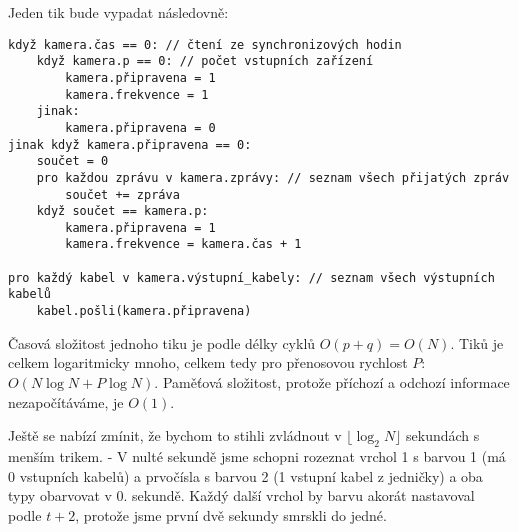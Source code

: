 \documentclass{article}
\begin{document}
Jeden tik bude vypadat následovně:
\begin{verbatim}
když kamera.čas == 0: // čtení ze synchronizových hodin
    když kamera.p == 0: // počet vstupních zařízení
        kamera.připravena = 1
        kamera.frekvence = 1
    jinak:
        kamera.připravena = 0
jinak když kamera.připravena == 0:
    součet = 0
    pro každou zprávu v kamera.zprávy: // seznam všech přijatých zpráv
        součet += zpráva
    když součet == kamera.p:
        kamera.připravena = 1
        kamera.frekvence = kamera.čas + 1

pro každý kabel v kamera.výstupní_kabely: // seznam všech výstupních kabelů
    kabel.pošli(kamera.připravena)
\end{verbatim}
Časová složitost jednoho tiku je podle délky cyklů \(O(p + q) = O(N)\). Tiků je celkem logaritmicky mnoho, celkem tedy pro přenosovou rychlost
\(P\): \(O(N \log N + P\log N)\). Paměťová složitost, protože příchozí a odchozí informace nezapočítáváme, je \(O(1)\).

Ještě se nabízí zmínit, že bychom to stihli zvládnout v \(\lfloor \log_2 N \rfloor\) sekundách s menším trikem. - V nulté sekundě jsme schopni rozeznat vrchol 1 s barvou 1
(má 0 vstupních kabelů) a prvočísla s barvou 2 (1 vstupní kabel z jedničky) a oba typy obarvovat v 0. sekundě. Každý další vrchol by barvu akorát nastavoval
podle \(t+2\), protože jsme první dvě sekundy smrskli do jedné.
\end{document}

